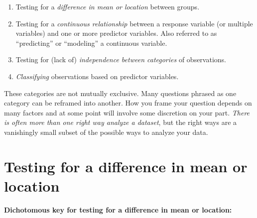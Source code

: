 \documentclass[
  13,
  letterpaper,
]{report}
\providecommand{\tightlist}{%
  \setlength{\itemsep}{0pt}\setlength{\parskip}{0pt}}
\begin{document}
\begin{enumerate}
\def\labelenumi{\arabic{enumi}.}
\tightlist
\item
  Testing for a \emph{difference in mean or location} between groups.
\item
  Testing for a \emph{continuous relationship} between a response
  variable (or multiple variables) and one or more predictor variables.
  Also referred to as ``predicting'' or ``modeling'' a continuous
  variable.
\item
  Testing for (lack of) \emph{independence between categories} of
  observations.
\item
  \emph{Classifying} observations based on predictor variables.
\end{enumerate}

These categories are not mutually exclusive. Many questions phrased as
one category can be reframed into another. How you frame your question
depends on many factors and at some point will involve some discretion
on your part. \emph{There is often more than one right way analyze a
dataset}, but the right ways are a vanishingly small subset of the
possible ways to analyze your data.

\section{Testing for a difference in mean or
location}\label{sec-plan-meanloc}

\textbf{Dichotomous key for testing for a difference in mean or
location:}
\end{document}
